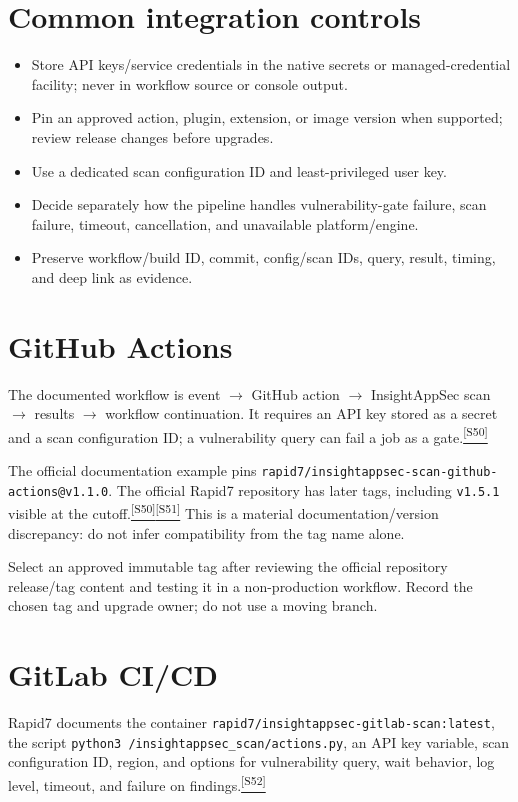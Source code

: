 \documentclass[11pt,letterpaper,oneside]{scrreprt}
\newcommand{\src}[1]{\hyperref[src:#1]{\textsuperscript{\color{R7Orange}[#1]}}}
\newcommand{\code}[1]{\texttt{#1}}
\begin{document}
\section{Common integration controls}
\begin{itemize}
  \item Store API keys/service credentials in the native secrets or managed-credential facility; never in workflow source or console output.
  \item Pin an approved action, plugin, extension, or image version when supported; review release changes before upgrades.
  \item Use a dedicated scan configuration ID and least-privileged user key.
  \item Decide separately how the pipeline handles vulnerability-gate failure, scan failure, timeout, cancellation, and unavailable platform/engine.
  \item Preserve workflow/build ID, commit, config/scan IDs, query, result, timing, and deep link as evidence.
\end{itemize}

\section{GitHub Actions}
The documented workflow is event $\rightarrow$ GitHub action $\rightarrow$ InsightAppSec scan $\rightarrow$ results $\rightarrow$ workflow continuation. It requires an API key stored as a secret and a scan configuration ID; a vulnerability query can fail a job as a gate.\src{S50}

The official documentation example pins \code{rapid7/insightappsec-scan-github-actions@v1.1.0}. The official Rapid7 repository has later tags, including \code{v1.5.1} visible at the cutoff.\src{S50}\src{S51} This is a material documentation/version discrepancy: do not infer compatibility from the tag name alone.

\begin{oprec}
Select an approved immutable tag after reviewing the official repository release/tag content and testing it in a non-production workflow. Record the chosen tag and upgrade owner; do not use a moving branch.
\end{oprec}

\section{GitLab CI/CD}
Rapid7 documents the container \code{rapid7/insightappsec-gitlab-scan:latest}, the script \code{python3 /insightappsec\_\allowbreak scan/actions.py}, an API key variable, scan configuration ID, region, and options for vulnerability query, wait behavior, log level, timeout, and failure on findings.\src{S52}
\end{document}
